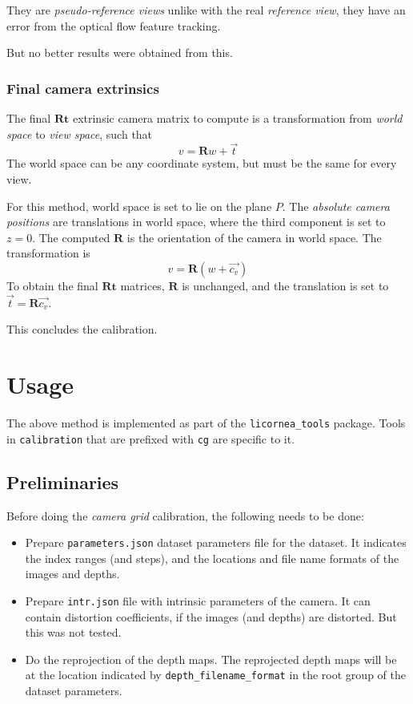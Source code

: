 \documentclass[11pt]{scrreprt}
\newcommand{\matr}[1]{\mathbf{#1}}
\begin{document}
They are \emph{pseudo-reference views} unlike with the real \emph{reference view}, they have an error from the optical flow feature tracking.

But no better results were obtained from this.


\subsection{Final camera extrinsics}
The final $\matr{Rt}$ extrinsic camera matrix to compute is a transformation from \emph{world space} to \emph{view space}, such that
\begin{equation*}
v = \matr{R} w + \vec{t}
\end{equation*}
The world space can be any coordinate system, but must be the same for every view.

For this method, world space is set to lie on the plane $P$. The \emph{absolute camera positions} are translations in world space, where the third component is set to $z = 0$. The computed $\matr{R}$ is the orientation of the camera in world space. The transformation is
\begin{equation*}
v = \matr{R} (w + \vec{c_v})
\end{equation*}
To obtain the final $\matr{Rt}$ matrices, $\matr{R}$ is unchanged, and the translation is set to $\vec{t} = \matr{R} \vec{c_v}$.

This concludes the calibration.


\chapter{Usage}
The above method is implemented as part of the \texttt{licornea\_tools} package. Tools in \texttt{calibration} that are prefixed with \texttt{cg} are specific to it.

\section{Preliminaries}
Before doing the \emph{camera grid} calibration, the following needs to be done:
\begin{itemize}
\item Prepare \texttt{parameters.json} dataset parameters file for the dataset. It indicates the index ranges (and steps), and the locations and file name formats of the images and depths.
\item Prepare \texttt{intr.json} file with intrinsic parameters of the camera. It can contain distortion coefficients, if the images (and depths) are distorted. But this was not tested.
\item Do the reprojection of the depth maps. The reprojected depth maps will be at the location indicated by \texttt{depth\_filename\_format} in the root group of the dataset parameters.
\end{itemize}
\end{document}
